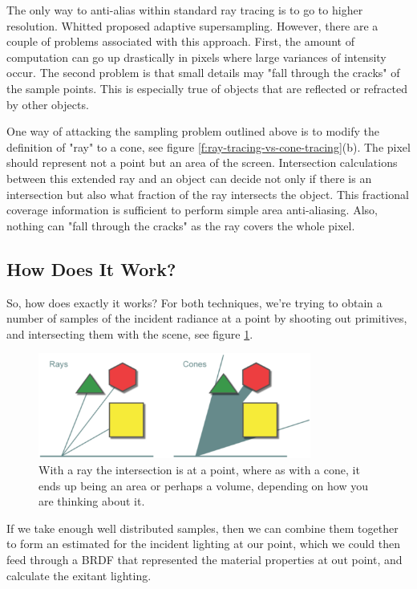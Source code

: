 The only way to anti-alias within standard ray tracing is to go to higher resolution. Whitted proposed adaptive supersampling\cite{a:ray-tracing}. However, there are a couple of problems associated with this approach. First, the amount of computation can go up drastically in pixels where large variances of intensity occur. The second problem is that small details may "fall through the cracks" of the sample points. This is especially true of objects that are reflected or refracted by other objects.

One way of attacking the sampling problem outlined above is to modify the definition of "ray" to a cone, see figure \ref{f:ray-tracing-vs-cone-tracing}(b). The pixel should represent not a point but an area of the screen. Intersection calculations between this extended ray and an object can decide not only if there is an intersection but also what fraction of the ray intersects the object. This fractional coverage information is sufficient to perform simple area anti-aliasing. Also, nothing can "fall through the cracks" as the ray covers the whole pixel.  



\subsection{How Does It Work?}
So, how does exactly it works? For both techniques, we're trying to obtain a number of samples of the incident radiance at a point by shooting out primitives, and intersecting them with the scene, see figure \ref{f:rays-and-cones}.

\begin{figure}\label{f:rays-and-cones}
	\begin{center}
		\includegraphics[width=0.8\textwidth]{graphics/vct/vct-2-1}
	\end{center}
	\caption{With a ray the intersection is at a point, where as with a cone, it ends up being an area or perhaps a volume, depending on how you are thinking about it.}
\end{figure}

If we take enough well distributed samples, then we can combine them together to form an estimated for the incident lighting at our point, which we could then feed through a BRDF that represented the material properties at out point, and calculate the exitant lighting.


